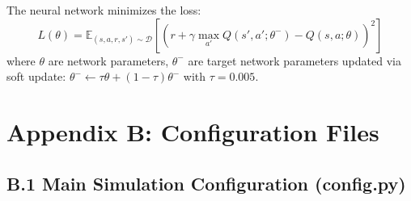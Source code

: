\documentclass[12pt,a4paper]{article}
\begin{document}
The neural network minimizes the loss:
\begin{equation}
L(\theta) = \mathbb{E}_{(s,a,r,s') \sim \mathcal{D}}\left[\left(r + \gamma \max_{a'} Q(s', a'; \theta^-) - Q(s, a; \theta)\right)^2\right]
\end{equation}
where $\theta$ are network parameters, $\theta^-$ are target network parameters updated via soft update: $\theta^- \leftarrow \tau\theta + (1-\tau)\theta^-$ with $\tau = 0.005$.

\clearpage

\section*{Appendix B: Configuration Files}

\subsection*{B.1 Main Simulation Configuration (config.py)}
\end{document}
